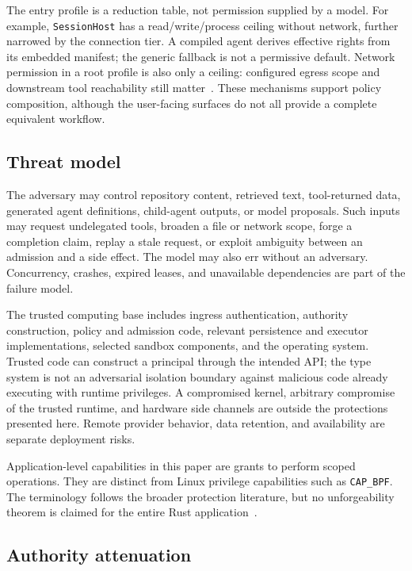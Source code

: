 The entry profile is a reduction table, not permission supplied by a model. For example, \texttt{SessionHost} has a read/write/process ceiling without network, further narrowed by the connection tier. A compiled agent derives effective rights from its embedded manifest; the generic fallback is not a permissive default. Network permission in a root profile is also only a ceiling: configured egress scope and downstream tool reachability still matter~\cite{ref11}. These mechanisms support policy composition, although the user-facing surfaces do not all provide a complete equivalent workflow.

\subsection{Threat model}

The adversary may control repository content, retrieved text, tool-returned data, generated agent definitions, child-agent outputs, or model proposals. Such inputs may request undelegated tools, broaden a file or network scope, forge a completion claim, replay a stale request, or exploit ambiguity between an admission and a side effect. The model may also err without an adversary. Concurrency, crashes, expired leases, and unavailable dependencies are part of the failure model.

The trusted computing base includes ingress authentication, authority construction, policy and admission code, relevant persistence and executor implementations, selected sandbox components, and the operating system. Trusted code can construct a principal through the intended API; the type system is not an adversarial isolation boundary against malicious code already executing with runtime privileges. A compromised kernel, arbitrary compromise of the trusted runtime, and hardware side channels are outside the protections presented here. Remote provider behavior, data retention, and availability are separate deployment risks.

Application-level capabilities in this paper are grants to perform scoped operations. They are distinct from Linux privilege capabilities such as \texttt{CAP\_BPF}. The terminology follows the broader protection literature, but no unforgeability theorem is claimed for the entire Rust application~\cite{ref12}.

\subsection{Authority attenuation}
\label{sec:attenuation}

